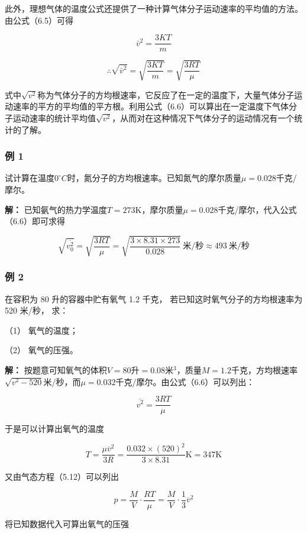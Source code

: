 此外，理想气体的温度公式还提供了一种计算气体分子运动速率的平均值的方法。由公式（6.5）可得

\[
\bar {v} ^ {2} = \frac {3 K T}{m}
\]

\[
\therefore \sqrt {\bar {v} ^ {2}} = \sqrt {\frac {3 K T}{m}} = \sqrt {\frac {3 R T}{\mu}} \tag {6.6}
\]

式中\(\sqrt{v^2}\)称为气体分子的方均根速率，它反应了在一定的温度下，大量气体分子运动速率的平方的平均值的平方根。利用公式（6.6）可以算出在一定温度下气体分子运动速率的统计平均值\(\sqrt{v^2}\)，从而对在这种情况下气体分子的运动情况有一个统计的了解。

\subsubsection{例 1}\label{ux4f8b-1-6}

试计算在温度\(0^{\circ}C\)时，氮分子的方均根速率。已知氮气的摩尔质量\(\mu = 0.028\)千克/摩尔。

\textbf{解：}
已知氨气的热力学温度\(T = 273\mathrm{K}\)，摩尔质量\(\mu = 0.028\)千克/摩尔，代入公式（6.6）即可求得

\[
\sqrt{\overline{v_0^2}}=\sqrt{\frac{3RT}{\mu}}=\sqrt{\frac{3\times8.31\times273}{0.028}}\ \text{米/秒}\approx493\ \text{米/秒}
\]

\subsubsection{例 2}\label{ux4f8b-2-6}

在容积为 80 升的容器中贮有氧气 1.2 千克，
若已知这时氧气分子的方均根速率为 520 米/秒， 求：

（1） 氧气的温度；

（2） 氧气的压强。

\textbf{解：}
按题意可知氧气的体积\(V = 80\)升\(= 0.08\)米\(^3\)，质量\(M = 1.2\)千克，方均根速率\(\sqrt{v^2 - 520}\)米/秒，而\(\mu = 0.032\)千克/摩尔。由公式（6.6）可以列出：

\[
\overline{v^2}=\frac{3RT}{\mu}
\]

于是可以计算出氧气的温度

\[
T = \frac {\mu \overline {{v}} ^ {2}}{3 R} = \frac {0.032 \times (520) ^ {2}}{3 \times 8.31} \mathrm{K} = 347 \mathrm{K}
\]

又由气态方程（5.12）可以列出

\[
p = \frac {M}{V} \cdot \frac {R T}{\mu} = \frac {M}{V} \cdot \frac {1}{3} \overline {{v}} ^ {2}
\]

将已知数据代入可算出氧气的压强

